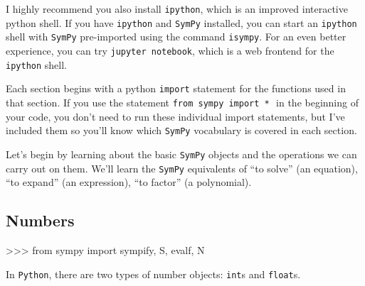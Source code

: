 I highly recommend you also install \texttt{ipython},
which is an improved interactive python shell.
If you have \texttt{ipython} and \texttt{SymPy} installed,
you can start an \texttt{ipython} shell with \texttt{SymPy} pre-imported using the command \texttt{isympy}.
For an even better experience,
you can try \texttt{jupyter notebook},
which is a web frontend for the \texttt{ipython} shell.

Each section  begins with a python \texttt{import} statement
for the functions used in that section.
If you use the statement \texttt{from sympy import *}\,\, in the beginning of your code,
you don't need to run these individual import statements,
but I've included them so you'll know which 
\texttt{SymPy} vocabulary is covered in each section.





%

\label{sec:sympytut_fundamentals_of_mathematics}

Let's begin by learning about the basic \texttt{SymPy} objects and the operations we can carry out on them. 
We'll learn the \texttt{SymPy} equivalents of 
``to solve'' (an equation),  
``to expand'' (an expression), 
``to factor'' (a polynomial).

\subsection{Numbers}
\label{basics:numbers}

\small
\begin{verbatimtab}
>>> from sympy import  sympify, S,  evalf, N
\end{verbatimtab}
\normalsize

\noindent
In \texttt{Python}, there are two types of number objects: \texttt{int}s and \texttt{float}s.%

